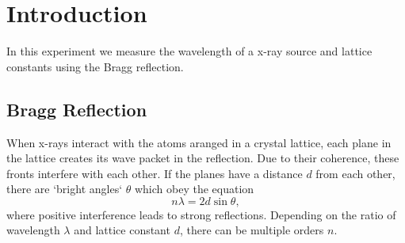 \section{Introduction}
\label{sec:introduction}
In this experiment we measure the wavelength of a x-ray source and lattice constants using the Bragg
reflection.

\subsection{Bragg Reflection}
\label{sec:Bragg Reflection}
When x-rays interact with the atoms aranged in a crystal lattice, each plane in the lattice creates
its wave packet in the reflection. Due to their coherence, these fronts interfere with each other.
If the planes have a distance $d$ from each other, there are `bright angles` $\theta$ which obey the
equation
\begin{equation}
  n\lambda = 2d \sin\theta,
\end{equation}
where positive interference leads to strong reflections. Depending on the ratio of wavelength
$\lambda$ and lattice constant $d$, there can be multiple orders $n$.

